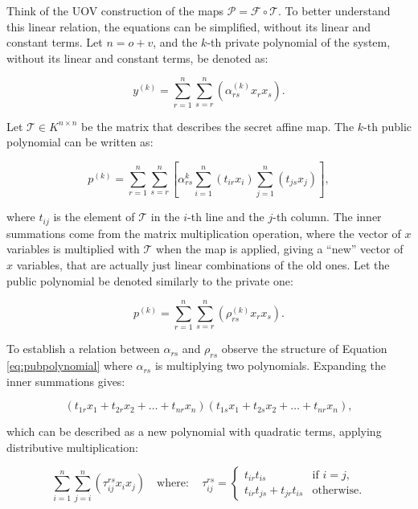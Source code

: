 \documentclass{ufsctex/ufsctex}
\begin{document}
Think of the UOV construction of the maps $\mathcal{P} = \mathcal{F} \circ
\mathcal{T}$. To better understand this linear relation, the equations can be
simplified, without its linear and constant terms. Let $n = o + v$, and the
$k$-th private polynomial of the system, without its linear and constant terms,
be denoted as:

\begin{equation}
y^{(k)} = \sum_{r=1}^n \sum_{s=r}^n\left(\alpha^{(k)}_{rs}x_rx_s\right).
\end{equation}

Let $\mathcal{T} \in K^{n \times n}$ be the matrix that describes the secret
affine map. The $k$-th public polynomial can be written as:

\begin{equation}\label{eq:pubpolynomial}
p^{(k)} = \sum_{r=1}^n \sum_{s=r}^n
\left[ \alpha^{k}_{rs} \sum_{i=1}^n(t_{ir}x_i) \sum_{j=1}^n(t_{js}x_j) \right],
\end{equation}

\noindent
where $t_{ij}$ is the element of $\mathcal{T}$ in the $i$-th line and the
$j$-th column. The inner summations come from the matrix multiplication
operation, where the vector of $x$ variables is multiplied with $\mathcal{T}$
when the map is applied, giving a ``new'' vector of $x$ variables, that are
actually just linear combinations of the old ones. Let the public polynomial be
denoted similarly to the private one:

\begin{equation}
p^{(k)} = \sum_{r=1}^n \sum_{s=r}^n \left( \rho^{(k)}_{rs}x_rx_s \right).
\end{equation}

To establish a relation between $\alpha_{rs}$ and $\rho_{rs}$
observe the structure of Equation \ref{eq:pubpolynomial} where $\alpha_{rs}$ is
multiplying two polynomials. Expanding the inner summations gives:

\begin{equation}
(t_{1r}x_1 + t_{2r}x_2 + \dots + t_{nr}x_n)
(t_{1s}x_1 + t_{2s}x_2 + \dots + t_{nr}x_n),
\end{equation}

\noindent
which can be described as a new polynomial with quadratic terms, applying
distributive multiplication:

\begin{equation}\label{eq:tau}
\sum_{i=1}^{n}\sum_{j=i}^n \left( \tau^{rs}_{ij} x_i x_j \right)
\quad \mathrm{where:} \quad \tau^{rs}_{ij} =
\begin{cases}
	t_{ir} t_{is} &\mbox{if } i=j, \\
	t_{ir} t_{js} + t_{jr} t_{is} &\mbox{otherwise.}
\end{cases}
\end{equation}
\end{document}
